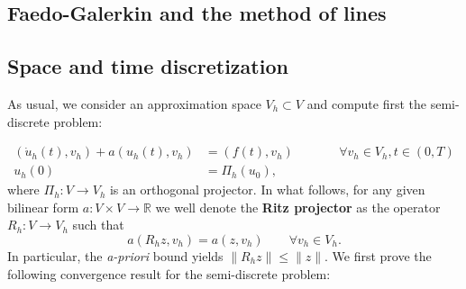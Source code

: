 \documentclass{article}
\newcommand{\R}{\mathbb{R}}
\begin{document}
\subsection{Faedo-Galerkin and the method of lines}


\subsection{Space and time discretization}
As usual, we consider an approximation space $V_h\subset V$  and compute first the semi-discrete problem: 

\begin{equation}\label{eq:semi-discrete in time}
    \begin{aligned}
        (\dot u_h(t), v_h) + a(u_h(t), v_h) &= (f(t),v_h) &&\qquad \forall v_h\in V_h, t \in(0,T)  \\
                                u_h(0)&= \Pi_h(u_0), 
    \end{aligned}
\end{equation}
where $\Pi_h:V\to V_h$ is an orthogonal projector. In what follows, for any given bilinear form $a:V\times V\to \R$ we well denote the \textbf{Ritz projector} as the operator $R_h:V\to V_h$ such that 
    $$ a(R_h z, v_h) = a(z, v_h) \qquad \forall v_h \in V_h. $$
In particular, the \emph{a-priori} bound yields $\|R_h z \| \leq \| z \|$.  We first prove the following convergence result for the semi-discrete problem: 
\end{document}
